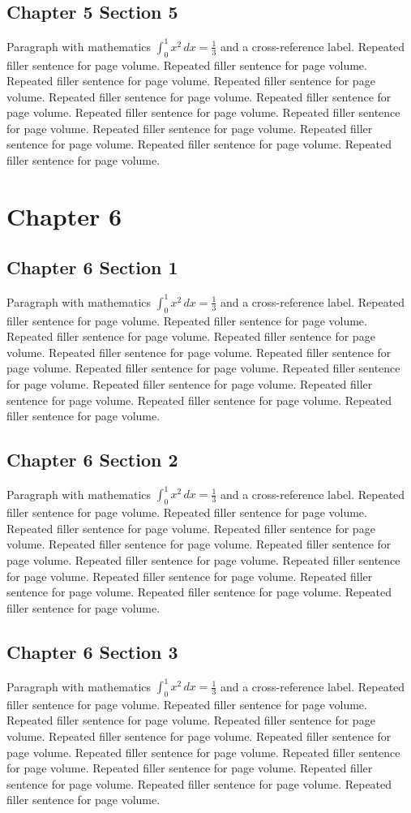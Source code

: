 \documentclass[11pt]{report}
\begin{document}
\section{Chapter 5 Section 5}
Paragraph with mathematics $\int_0^1 x^2\,dx = \frac13$ and a cross-reference label.
\label{sec:5:5}
Repeated filler sentence for page volume. Repeated filler sentence for page volume. Repeated filler sentence for page volume. Repeated filler sentence for page volume. Repeated filler sentence for page volume. Repeated filler sentence for page volume. Repeated filler sentence for page volume. Repeated filler sentence for page volume. Repeated filler sentence for page volume. Repeated filler sentence for page volume. Repeated filler sentence for page volume. Repeated filler sentence for page volume. 
\chapter{Chapter 6}
\section{Chapter 6 Section 1}
Paragraph with mathematics $\int_0^1 x^2\,dx = \frac13$ and a cross-reference label.
\label{sec:6:1}
Repeated filler sentence for page volume. Repeated filler sentence for page volume. Repeated filler sentence for page volume. Repeated filler sentence for page volume. Repeated filler sentence for page volume. Repeated filler sentence for page volume. Repeated filler sentence for page volume. Repeated filler sentence for page volume. Repeated filler sentence for page volume. Repeated filler sentence for page volume. Repeated filler sentence for page volume. Repeated filler sentence for page volume. 
\section{Chapter 6 Section 2}
Paragraph with mathematics $\int_0^1 x^2\,dx = \frac13$ and a cross-reference label.
\label{sec:6:2}
Repeated filler sentence for page volume. Repeated filler sentence for page volume. Repeated filler sentence for page volume. Repeated filler sentence for page volume. Repeated filler sentence for page volume. Repeated filler sentence for page volume. Repeated filler sentence for page volume. Repeated filler sentence for page volume. Repeated filler sentence for page volume. Repeated filler sentence for page volume. Repeated filler sentence for page volume. Repeated filler sentence for page volume. 
\section{Chapter 6 Section 3}
Paragraph with mathematics $\int_0^1 x^2\,dx = \frac13$ and a cross-reference label.
\label{sec:6:3}
Repeated filler sentence for page volume. Repeated filler sentence for page volume. Repeated filler sentence for page volume. Repeated filler sentence for page volume. Repeated filler sentence for page volume. Repeated filler sentence for page volume. Repeated filler sentence for page volume. Repeated filler sentence for page volume. Repeated filler sentence for page volume. Repeated filler sentence for page volume. Repeated filler sentence for page volume. Repeated filler sentence for page volume. 
\end{document}
